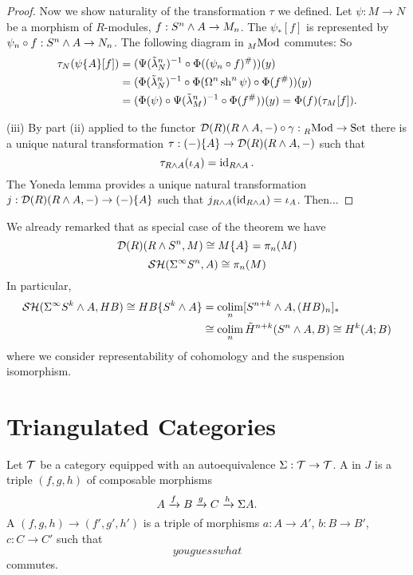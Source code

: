 \begin{proof}
Now we show naturality of the transformation $\tau$ we defined. Let $\psi:M\to N$ be a morphism of $R$-modules, $f:S^n\wedge A\to M_n$. The $\psi_*[f]$ is represented by $\psi_n\circ f:S^n\wedge A\to N_n$. The following diagram in $\prescript{}{M}{\operatorname{Mod}}$ commutes:
\medskip
{}
\smallskip\noindent
So
\begin{align*}
    \tau_N(\psi\{A\}[f])&=(\Psi(\tilde\lambda^n_N)^{-1}\circ\Phi((\psi_n\circ f)^\#))(y)\\
    &=(\Phi(\tilde\lambda^n_N)^{-1}\circ\Phi(\Omega^n\operatorname{sh}^n\psi)\circ\Phi(f^\#))(y)\\
    &=(\Phi(\psi)\circ\Psi(\tilde\lambda^n_M)^{-1}\circ\Phi(f^\#))(y)=\Phi(f)(\tau_M[f]).
\end{align*}

(iii) By part (ii) applied to the functor $\mathcal{D}(R)(R\wedge A,-)\circ\gamma:\prescript{}{R}{\operatorname{Mod}}\to{\normalfont\textup{Set}}$ there is a unique natural transformation $\tau:(-)\{A\}\to\mathcal{D}(R)(R\wedge A,-)$ such that
\[\tau_{R\wedge A}(\iota_A)=\operatorname{id}_{R\wedge A}.\]
The Yoneda lemma provides a unique natural transformation $j:\mathcal{D}(R)(R\wedge A,-)\to(-)\{A\}$ such that $j_{R\wedge A}(\operatorname{id}_{R\wedge A})=\iota_A$. Then...

\medskip
{}
\smallskip

\end{proof}

\begin{remark}
We already remarked that as special case of the theorem we have
\[\mathcal{D}(R)(R\wedge S^n,M)\cong M\{A\}=\pi_n(M)\]
\[\mathcal{S}\mathcal{H}(\Sigma^\infty S^n,A)\cong\pi_n(M)\]
In particular,
\begin{align*}
    \mathcal{S}\mathcal{H}(\Sigma^\infty S^k\wedge A,HB)\cong HB\{S^k\wedge A\}&=\operatorname*{colim}_n[S^{n+k}\wedge A,(HB)_n]_*\\
    &\cong\operatorname*{colim}_n \tilde H^{n+k}(S^n\wedge A,B)\cong H^k(A;B)
\end{align*}
where we consider representability of cohomology and the suspension isomorphism.
\end{remark}

\section{Triangulated Categories}

Let $\mathcal{T}$ be a category equipped with an autoequivalence $\Sigma:\mathcal{T}\to\mathcal{T}$. A  in $J$ is a triple $(f,g,h)$ of composable morphisms
\[A\xrightarrow{f}B\xrightarrow{g}C\xrightarrow{h}\Sigma A.\]
A  $(f,g,h)\to(f',g',h')$ is a triple of morphisms $a:A\to A'$, $b:B\to B'$, $c:C\to C'$ such that
\[youguesswhat\]
commutes.

